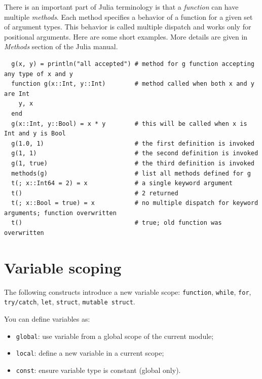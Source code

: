 \documentclass[10pt,a4paper]{article}
\begin{document}
There is an important part of Julia terminology is that a \emph{function} can have multiple \emph{methods}. Each method specifies a behavior of a function for a given set of argument types. This behavior is called multiple dispatch and works only for positional arguments. Here are some short examples. More details are given in \emph{Methods} section of the Julia manual.
\begin{lstlisting}
  g(x, y) = println("all accepted") # method for g function accepting any type of x and y
  function g(x::Int, y::Int)        # method called when both x and y are Int
    y, x
  end
  g(x::Int, y::Bool) = x * y        # this will be called when x is Int and y is Bool
  g(1.0, 1)                         # the first definition is invoked
  g(1, 1)                           # the second definition is invoked
  g(1, true)                        # the third definition is invoked
  methods(g)                        # list all methods defined for g
  t(; x::Int64 = 2) = x             # a single keyword argument
  t()                               # 2 returned
  t(; x::Bool = true) = x           # no multiple dispatch for keyword arguments; function overwritten
  t()                               # true; old function was overwritten
\end{lstlisting}

\section{Variable scoping}
The following constructs introduce a new variable scope:
\lstinline|function|, \lstinline|while|,
\lstinline|for|, \lstinline|try/catch|,
\lstinline|let|, \lstinline|struct|, \lstinline|mutable struct|.

You can define variables as:
\begin{itemize}
  \item \lstinline|global|: use variable from a global scope of the current module;
  \item \lstinline|local|: define a new variable in a current scope;
  \item \lstinline|const|: ensure variable type is constant (global only).
\end{itemize}
\end{document}
